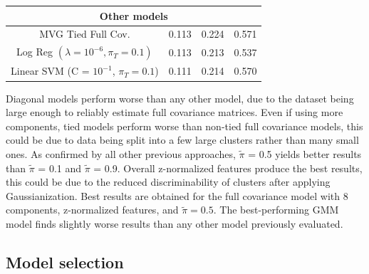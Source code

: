 \documentclass[12pt,a4paper]{article}
\begin{document}
\begin{center}
\begin{tabular}{@{}cccc@{}}
        \hline
        \multicolumn{4}{c}{Other models}                                                                                   \\
        \hline
        MVG Tied Full Cov.                           & 0.113                & 0.224                 & 0.571                \\
        Log Reg \((\lambda = 10^{-6}, \pi_T = 0.1)\) & 0.113                & 0.213                 & 0.537                \\
        Linear SVM (C = $10^{-1}$, $\pi_T = 0.1$)    & 0.111                & 0.214                 & 0.570                \\
    \end{tabular}
\end{center}

Diagonal models perform worse than any other model, due to the dataset being large enough to reliably estimate full covariance matrices.
Even if using more components, tied models perform worse than non-tied full covariance models, this could be due to data being split into a few large clusters rather than many small ones.
As confirmed by all other previous approaches, \(\tilde{\pi}\) = 0.5 yields better results than \(\tilde{\pi}\) = 0.1 and \(\tilde{\pi}\) = 0.9.
Overall z-normalized features produce the best results, this could be due to the reduced discriminability of clusters after applying Gaussianization.
Best results are obtained for the full covariance model with 8 components, z-normalized features, and $\tilde{\pi} = 0.5$.
The best-performing GMM model finds slightly worse results than any other model previously evaluated.


\subsection{Model selection}
\end{document}
